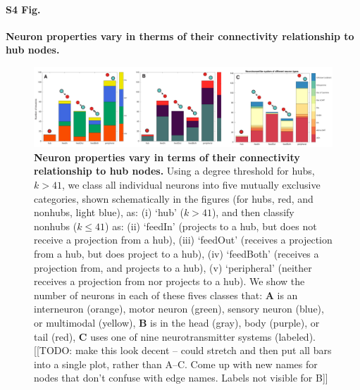 \documentclass[10pt,letterpaper]{article}
\begin{document}
\paragraph*{S4 Fig.}
{\bf Neuron properties vary in therms of their connectivity relationship to hub nodes. }
\begin{figure}[h]
\centering
    \includegraphics[width=1\textwidth]{FeedInOutNodes.pdf}
\caption{
\textbf{Neuron properties vary in terms of their connectivity relationship to hub nodes.}
Using a degree threshold for hubs, $k > 41$, we class all individual neurons into five mutually exclusive categories, shown schematically in the figures (for hubs, red, and nonhubs, light blue), as:
(i) `hub' ($k>41$),
and then classify nonhubs ($k\leq41$) as:
(ii) `feedIn' (projects to a hub, but does not receive a projection from a hub),
(iii) `feedOut' (receives a projection from a hub, but does project to a hub),
(iv) `feedBoth' (receives a projection from, and projects to a hub),
(v) `peripheral' (neither receives a projection from nor projects to a hub).
We show the number of neurons in each of these fives classes that:
\textbf{A} is an interneuron (orange), motor neuron (green), sensory neuron (blue), or multimodal (yellow),
\textbf{B} is in the head (gray), body (purple), or tail (red),
\textbf{C} uses one of nine neurotransmitter systems (labeled).
\label{fig:S_feedInOutNodes}
[[TODO: make this look decent -- could stretch and then put all bars into a single plot, rather than A--C. Come up with new names for nodes that don't confuse with edge names. Labels not visible for B]]
}
\end{figure}


\end{document}
